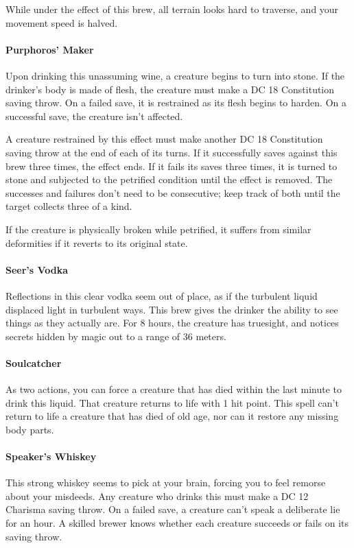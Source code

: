     While under the effect of this brew, all terrain looks hard to traverse, and your movement speed is halved.
\paragraph{Purphoros' Maker} %
    Upon drinking this unassuming wine, a creature begins to turn into stone.
    If the drinker's body is made of flesh, the creature must make a DC 18 Constitution saving throw.
    On a failed save, it is restrained as its flesh begins to harden.
    On a successful save, the creature isn't affected.

    A creature restrained by this effect must make another DC 18 Constitution saving throw at the end of each of its turns.
    If it successfully saves against this brew three times, the effect ends.
    If it fails its saves three times, it is turned to stone and subjected to the petrified condition until the effect is removed.
    The successes and failures don't need to be consecutive; keep track of both until the target collects three of a kind.

    If the creature is physically broken while petrified, it suffers from similar deformities if it reverts to its original state.
\paragraph{Seer's Vodka} %
    Reflections in this clear vodka seem out of place, as if the turbulent liquid displaced light in turbulent ways.
    This brew gives the drinker the ability to see things as they actually are.
    For 8 hours, the creature has truesight, and notices secrets hidden by magic out to a range of 36 meters.
\paragraph{Soulcatcher} %
    As two actions, you can force a creature that has died within the last minute to drink this liquid.
    That creature returns to life with 1 hit point.
    This spell can't return to life a creature that has died of old age, nor can it restore any missing body parts.
\paragraph{Speaker's Whiskey} %
    This strong whiskey seems to pick at your brain, forcing you to feel remorse about your misdeeds.
    Any creature who drinks this must make a DC 12 Charisma saving throw.
    On a failed save, a creature can't speak a deliberate lie for an hour.
    A skilled brewer knows whether each creature succeeds or fails on its saving throw.

